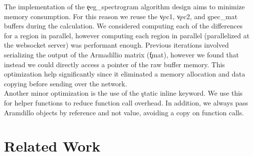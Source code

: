 The implementation of the \c{eeg\_spectrogram} algorithm design aims to
minimize memory consumption. For this reason we reuse the \c{vec1}, \c{vec2},
and \c{spec\_mat} buffers during the calculation. We considered computing each
of the differences for a region in parallel, however computing each region in
parallel (parallelized at the websocket server) was performant enough. Previous
iterations involved serializing the output of the Armadillio matrix (\c{fmat}),
however we found that instead we could directly access a pointer of the raw
buffer memory. This optimization help significantly since it eliminated a
memory allocation and data copying before sending over the network. \\

Another minor optimization is the use of the \c{static inline} keyword. We use
this for helper functions to reduce function call overhead. In addition, we
always pass Aramdillo objects by reference and not value, avoiding a copy on
function calls.

\section{Related Work}

